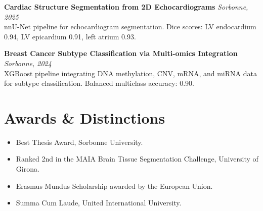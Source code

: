 \documentclass[10pt,a4paper]{article}
\begin{document}
\textbf{Cardiac Structure Segmentation from 2D Echocardiograms} \hfill \textit{Sorbonne, 2025}\\
nnU-Net pipeline for echocardiogram segmentation. Dice scores: LV endocardium 0.94, LV epicardium 0.91, left atrium 0.93.

\textbf{Breast Cancer Subtype Classification via Multi-omics Integration} \hfill \textit{Sorbonne, 2024}\\
XGBoost pipeline integrating DNA methylation, CNV, mRNA, and miRNA data for subtype classification. Balanced multiclass accuracy: 0.90.

\section*{Awards \& Distinctions}
\begin{itemize}
  \item Best Thesis Award, Sorbonne University.
  \item Ranked 2nd in the MAIA Brain Tissue Segmentation Challenge, University of Girona.
  \item Erasmus Mundus Scholarship awarded by the European Union.
  \item Summa Cum Laude, United International University.
\end{itemize}
\end{document}

